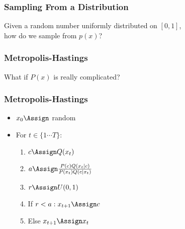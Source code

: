 \begin{frame}[fragile]
\frametitle{Sampling From a Distribution}

Given a random number uniformly distributed on $[0,1]$,\\
how do we sample from $p(x)$?
\end{frame}

\begin{frame}[fragile]
\frametitle{Metropolis-Hastings}
What if $P(x)$ is really complicated?
\end{frame}

\begin{frame}[fragile]
\frametitle{Metropolis-Hastings}
\begin{itemize}
\item $x_0 \Assign $ random
\item For $t \in \{ 1 \cdots T \}$:
\begin{enumerate}
\item $c \Assign Q(x_t)$
\item $a \Assign \frac{P(c)Q(x_t|c)}{P(x_t)Q(c|x_t)}$
\item $r \Assign U(0,1)$
\item If $r < a: x_{t+1} \Assign c$
\item Else $x_{t+1} \Assign x_t$
\end{enumerate}
\end{itemize}
\end{frame}


